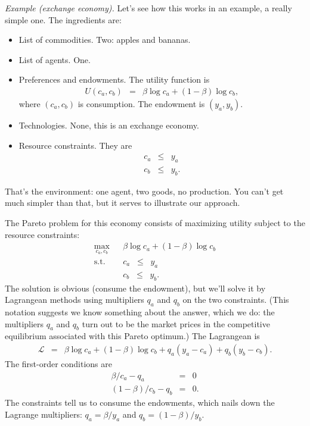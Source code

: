\documentclass[11pt]{article}
\begin{document}
{\it Example (exchange economy).\/}
Let's see how this works in an example, a really simple one.
The ingredients are:
%
\begin{itemize}
\item List of commodities.   Two:  apples and bananas.
\item List of agents.  One.
\item Preferences and endowments.  The utility function is
\begin{eqnarray*}
    U(c_a,c_b) &=& \beta \log c_a + (1-\beta) \log c_b ,
\end{eqnarray*}
where $(c_a,c_b)$ is consumption.
The endowment is $(y_a,y_b)$.
\item Technologies.  None, this is an exchange economy.
\item Resource constraints.  They are
\begin{eqnarray*}
    c_a &\leq& y_a \\
    c_b &\leq& y_b .
\end{eqnarray*}
\end{itemize}
That's the environment:  one agent, two goods, no production.
You can't get much simpler than that,
but it serves to illustrate our approach.

The Pareto problem for this economy consists of maximizing utility subject
to the resource constraints:
\begin{eqnarray*}
    \max_{c_a,c_b} &&  \beta \log c_a + (1-\beta) \log c_b \\
    \mbox{s.t.}   &&  c_a \;\;\leq\;\; y_a \\
                  &&  c_b \;\;\leq\;\; y_b .
\end{eqnarray*}
The solution is obvious (consume the endowment),
but we'll solve it by Lagrangean methods using
multipliers $q_a$ and $q_b$ on the two constraints.
(This notation suggests we know something about the answer,
which we do:  the multipliers $q_a$ and $q_b$ turn out to be the market prices
in the competitive equilibrium associated with this Pareto optimum.)
The Lagrangean is
\begin{eqnarray*}
    \mathcal{L} &=&  \beta \log c_a + (1-\beta) \log c_b
                + q_a (y_a - c_a) + q_b (y_b - c_b) .
\end{eqnarray*}
The first-order conditions are
\begin{eqnarray*}
    \beta/c_a - q_a &=& 0 \\
   (1-\beta)/c_b - q_b &=& 0 .
\end{eqnarray*}
The constraints tell us to consume the endowments,
which nails down the Lagrange multipliers:
$ q_a = \beta /y_a$ and $q_b = (1-\beta)/ y_b$.
\end{document}
